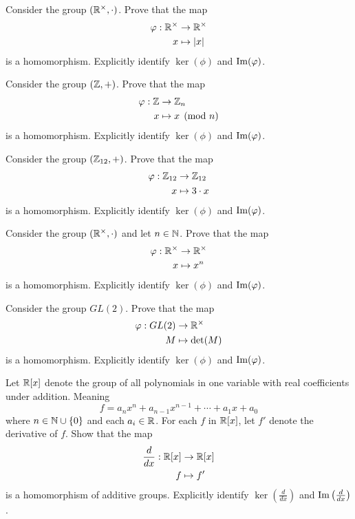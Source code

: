 \documentclass{ximera}
\begin{document}
\begin{exercise}
  Consider the group $(\mathbb R^\times,\cdot)$. Prove that
  the map
  \begin{align*}
    \varphi:\mathbb R^\times &\to \mathbb R^\times\\
    x &\mapsto |x|
  \end{align*}
  is a homomorphism. Explicitly identify $\ker(\phi)$ and
  $\operatorname{Im}(\varphi)$.
\end{exercise}


\begin{exercise}
  Consider the group $(\mathbb Z,+)$. Prove that
  the map
  \begin{align*}
    \varphi:\mathbb Z &\to \mathbb Z_n\\
    x &\mapsto x\pmod{n}
  \end{align*}
  is a homomorphism. Explicitly identify $\ker(\phi)$ and
  $\operatorname{Im}(\varphi)$.
\end{exercise}


\begin{exercise}
  Consider the group $(\mathbb Z_{12},+)$. Prove that the map
  \begin{align*}
    \varphi:\mathbb Z_{12} &\to \mathbb Z_{12}\\
    x &\mapsto 3\cdot x
  \end{align*}
  is a homomorphism. Explicitly identify $\ker(\phi)$ and
  $\operatorname{Im}(\varphi)$.
\end{exercise}



\begin{exercise}
  Consider the group $(\mathbb R^\times,\cdot)$ and let $n\in \mathbb N$. Prove that
  the map
  \begin{align*}
    \varphi:\mathbb R^\times &\to \mathbb R^\times\\
    x &\mapsto x^n
  \end{align*}
  is a homomorphism. Explicitly identify $\ker(\phi)$ and
  $\operatorname{Im}(\varphi)$.
\end{exercise}

\begin{exercise}
  Consider the group $GL(2)$. Prove that the map
  \begin{align*}
    \varphi:GL(2) &\to \mathbb R^\times\\
    M &\mapsto \det(M)
  \end{align*}
  is a homomorphism. Explicitly identify $\ker(\phi)$ and
  $\operatorname{Im}(\varphi)$.
\end{exercise}



\begin{exercise}
  Let $\mathbb R[x]$ denote the group of all polynomials in one variable with
  real coefficients under addition. Meaning
  \[
  f = a_n x^{n} + a_{n-1}x^{n-1} + \cdots + a_1x + a_0
  \]
  where $n\in\mathbb N\cup\{0\}$ and each $a_i\in\mathbb R$.  For each $f$ in $\mathbb R[x]$,
  let $f'$ denote the derivative of $f$. Show that the map
  \begin{align*}
    \frac{d}{dx}:\mathbb R[x]&\to\mathbb R[x]\\
    f  &\mapsto f'
  \end{align*}
  is a homomorphism of additive groups. Explicitly identify
  $\ker\left(\frac{d}{dx}\right)$ and $\operatorname{Im}\left(\frac{d}{dx}\right)$.
\end{exercise}
\end{document}
